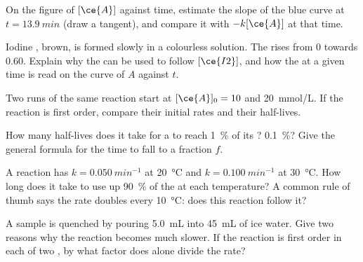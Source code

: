 \begin{exercise}[$\star\star$]\label{exo:g12:reaction-rates:9}
On the figure of $[\ce{A}]$ against time, estimate the slope of the blue
curve at $t = \qty{13.9}{min}$ (draw a tangent), and compare it with
$-k[\ce{A}]$ at that time.
\end{exercise}

\begin{exercise}[$\star\star$]\label{exo:g12:reaction-rates:10}
Iodine , brown, is formed slowly in a colourless solution. The
 rises from 0 towards 0.60. Explain why the  can be
used to follow $[\ce{I2}]$, and how the  at a given
time is read on the curve of $A$ against $t$.
\end{exercise}

\begin{exercise}[$\star\star$]\label{exo:g12:reaction-rates:11}
Two runs of the same reaction start at $[\ce{A}]_0 = 10$ and
\qty{20}{mmol/L}. If the reaction is first order, compare their initial
rates and their half-lives.
\end{exercise}

\begin{exercise}[$\star\star\star$]\label{exo:g12:reaction-rates:12}
How many half-lives does it take for a  to reach
\qty{1}{\percent} of its ? \qty{0.1}{\percent}? Give the general
formula for the time to fall to a fraction $f$.
\end{exercise}

\begin{exercise}[$\star\star\star$]\label{exo:g12:reaction-rates:13}
A reaction has $k = \qty{0.050}{min^{-1}}$ at \qty{20}{\celsius} and
$k = \qty{0.100}{min^{-1}}$ at \qty{30}{\celsius}. How long does it take
to use up \qty{90}{\percent} of the  at each temperature? A
common rule of thumb says the rate doubles every \qty{10}{\celsius}: does
this reaction follow it?
\end{exercise}

\begin{exercise}[$\star\star\star$]\label{exo:g12:reaction-rates:14}
A sample is quenched by pouring \qty{5.0}{mL} into \qty{45}{mL} of ice
water. Give two reasons why the reaction becomes much slower. If the
reaction is first order in each of two , by what factor does
 alone divide the rate?
\end{exercise}

